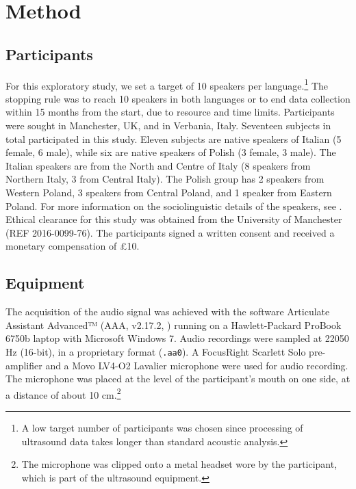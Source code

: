 \documentclass[12pt,]{article}
\let\rmarkdownfootnote\footnote%
\def\footnote{\protect\rmarkdownfootnote}
\begin{document}
\hypertarget{method}{%
\section{Method}\label{method}}

\label{s:method}

\hypertarget{participants}{%
\subsection{Participants}\label{participants}}

For this exploratory study, we set a target of 10 speakers per
language.\footnote{A low target number of participants was chosen since processing of ultrasound data takes longer than standard acoustic analysis.
} The stopping rule was to reach 10 speakers in both languages or to end
data collection within 15 months from the start, due to resource and
time limits. Participants were sought in Manchester, UK, and in
Verbania, Italy. Seventeen subjects in total participated in this study.
Eleven subjects are native speakers of Italian (5 female, 6 male), while
six are native speakers of Polish (3 female, 3 male). The Italian
speakers are from the North and Centre of Italy (8 speakers from
Northern Italy, 3 from Central Italy). The Polish group has 2 speakers
from Western Poland, 3 speakers from Central Poland, and 1 speaker from
Eastern Poland. For more information on the sociolinguistic details of
the speakers, see . Ethical clearance for this study
was obtained from the University of Manchester (REF 2016-0099-76). The
participants signed a written consent and received a monetary
compensation of £10.

\hypertarget{equipment}{%
\subsection{Equipment}\label{equipment}}

The acquisition of the audio signal was achieved with the software
Articulate Assistant Advanced™ (AAA, v2.17.2, \citealt{articulate2011})
running on a Hawlett-Packard ProBook 6750b laptop with Microsoft Windows
7. Audio recordings were sampled at 22050 Hz (16-bit), in a proprietary
format (\texttt{.aa0}). A FocusRight Scarlett Solo pre-amplifier and a
Movo LV4-O2 Lavalier microphone were used for audio recording. The
microphone was placed at the level of the participant's mouth on one
side, at a distance of about 10
cm.\footnote{The microphone was clipped onto a metal headset wore by the participant, which is part of the ultrasound equipment.}
\end{document}
